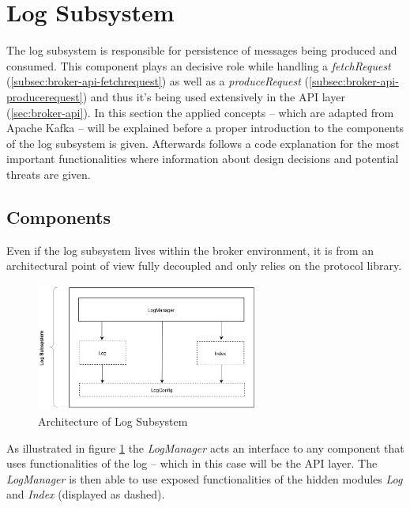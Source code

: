\newpage
\section{Log Subsystem}
\label{sec:impl-broker-log}

The log subsystem is responsible for persistence of messages being
produced and consumed. This component plays an decisive role while handling a
\textit{fetchRequest} (\ref{subsec:broker-api-fetchrequest}) as well as a
\textit{produceRequest} (\ref{subsec:broker-api-producerequest}) and thus it's
being used extensively in the API layer (\ref{sec:broker-api}). In this section
the applied concepts -- which are adapted from Apache Kafka -- will be explained
before a proper introduction to the components of the log subsystem is given.
Afterwards follows a code explanation for the  most important functionalities where
information about design decisions and potential threats are given.

\subsection{Components}

Even if the log subsystem lives within the broker environment, it is from an
architectural point of view fully decoupled and only relies on the protocol
library.

\begin{figure}[H]
    \centering
    \includegraphics[width=0.65\textwidth]{images/broker-log-overview.png}
    \caption{Architecture of Log Subsystem}
    \label{fig:broker-log-overview}
\end{figure}

As illustrated in figure \ref{fig:broker-log-overview} the \textit{LogManager}
acts an interface to any component that uses functionalities of the log -- which
in this case will be the API layer. The \textit{LogManager} is then able to use
exposed functionalities of the hidden modules \textit{Log} and
\textit{Index} (displayed as dashed). 

